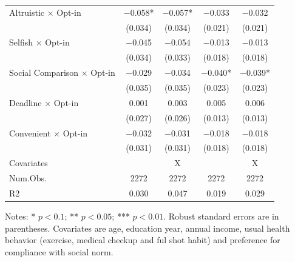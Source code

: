 \documentclass[
]{article}
\begin{document}
\begin{table}
\begin{threeparttable}
\begin{tabular}[t]{lcccc}
Altruistic $\times$ Opt-in & \num{-0.058}* & \num{-0.057}* & \num{-0.033} & \num{-0.032}\\
 & (\num{0.034}) & (\num{0.034}) & (\num{0.021}) & (\num{0.021})\\
Selfish $\times$ Opt-in & \num{-0.045} & \num{-0.054} & \num{-0.013} & \num{-0.013}\\
 & (\num{0.034}) & (\num{0.033}) & (\num{0.018}) & (\num{0.018})\\
Social Comparison $\times$ Opt-in & \num{-0.029} & \num{-0.034} & \num{-0.040}* & \num{-0.039}*\\
 & (\num{0.035}) & (\num{0.035}) & (\num{0.023}) & (\num{0.023})\\
Deadline $\times$ Opt-in & \num{0.001} & \num{0.003} & \num{0.005} & \num{0.006}\\
 & (\num{0.027}) & (\num{0.026}) & (\num{0.013}) & (\num{0.013})\\
Convenient $\times$ Opt-in & \num{-0.032} & \num{-0.031} & \num{-0.018} & \num{-0.018}\\
 & (\num{0.031}) & (\num{0.031}) & (\num{0.018}) & (\num{0.018})\\
\midrule
Covariates &  & X &  & X\\
Num.Obs. & \num{2272} & \num{2272} & \num{2272} & \num{2272}\\
R2 & \num{0.030} & \num{0.047} & \num{0.019} & \num{0.029}\\
\bottomrule
\end{tabular}
\begin{tablenotes}
\item Notes: * $p < 0.1$; ** $p < 0.05$; *** $p < 0.01$. Robust standard errors are in parentheses. Covariates are age, education year, annual income, usual health behavior (exercise, medical checkup and ful shot habit) and preference for compliance with social norm.
\end{tablenotes}
\end{threeparttable}
\end{table}
\end{document}
